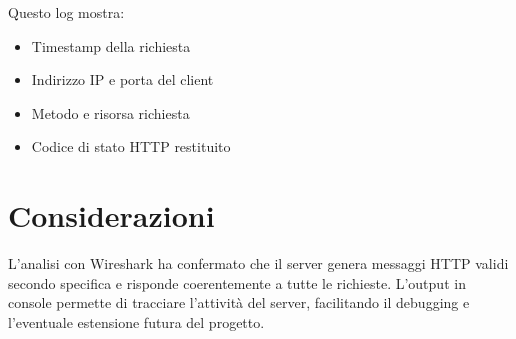 \documentclass[a4paper,12pt]{report}
\begin{document}
Questo log mostra:
\begin{itemize}
    \item Timestamp della richiesta
    \item Indirizzo IP e porta del client
    \item Metodo e risorsa richiesta
    \item Codice di stato HTTP restituito
\end{itemize}

\section{Considerazioni}

L’analisi con Wireshark ha confermato che il server genera messaggi HTTP validi secondo specifica e risponde coerentemente a tutte le richieste. L’output in console permette di tracciare l’attività del server, facilitando il debugging e l’eventuale estensione futura del progetto.
\end{document}
